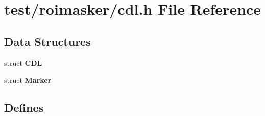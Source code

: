 \section{test/roimasker/cdl.h File Reference}
\label{roimasker_2cdl_8h}
\subsection*{Data Structures}
\begin{CompactItemize}
\item 
struct \bf{CDL}
\item 
struct \bf{Marker}
\end{CompactItemize}
\subsection*{Defines}

